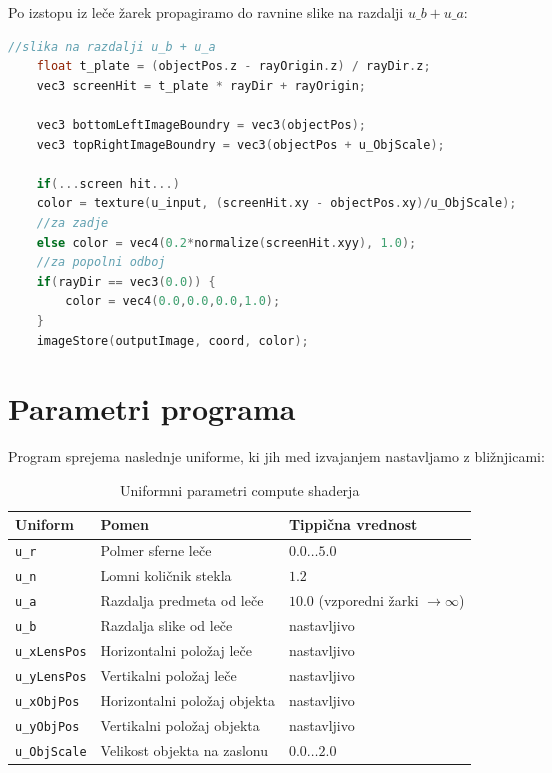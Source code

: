 \documentclass[a4paper,12pt]{article}
\begin{document}
    Po izstopu iz leče žarek propagiramo do ravnine slike na razdalji $u\_b + u\_a$:

    \begin{lstlisting}[language=C, caption={Vzorčenje objektne ravnine}]
    //slika na razdalji u_b + u_a
    float t_plate = (objectPos.z - rayOrigin.z) / rayDir.z;
    vec3 screenHit = t_plate * rayDir + rayOrigin;

    vec3 bottomLeftImageBoundry = vec3(objectPos);
    vec3 topRightImageBoundry = vec3(objectPos + u_ObjScale);

    if(...screen hit...)
    color = texture(u_input, (screenHit.xy - objectPos.xy)/u_ObjScale);
    //za zadje
    else color = vec4(0.2*normalize(screenHit.xyy), 1.0);
    //za popolni odboj
    if(rayDir == vec3(0.0)) {
        color = vec4(0.0,0.0,0.0,1.0);
    }
    imageStore(outputImage, coord, color);
    \end{lstlisting}

    \section{Parametri programa}

    Program sprejema naslednje uniforme, ki jih med izvajanjem nastavljamo z bližnjicami:

    \begin{table}[H]
        \centering
        \begin{tabular}{|l|l|l|}
            \hline
            \textbf{Uniform} & \textbf{Pomen} & \textbf{Tippična vrednost} \\
            \hline
            \texttt{u\_r}        & Polmer sferne leče              & $0.0 \ldots 5.0$ \\
            \texttt{u\_n}        & Lomni količnik stekla           & $1.2$ \\
            \texttt{u\_a}        & Razdalja predmeta od leče       & $10.0$ (vzporedni žarki $\to \infty$) \\
            \texttt{u\_b}        & Razdalja slike od leče          & nastavljivo \\
            \texttt{u\_xLensPos} & Horizontalni položaj leče       & nastavljivo \\
            \texttt{u\_yLensPos} & Vertikalni položaj leče         & nastavljivo \\
            \texttt{u\_xObjPos}  & Horizontalni položaj objekta    & nastavljivo \\
            \texttt{u\_yObjPos}  & Vertikalni položaj objekta      & nastavljivo \\
            \texttt{u\_ObjScale} & Velikost objekta na zaslonu     & $0.0 \ldots 2.0$ \\
            \hline
        \end{tabular}
        \caption{Uniformni parametri compute shaderja}
    \end{table}
\end{document}
